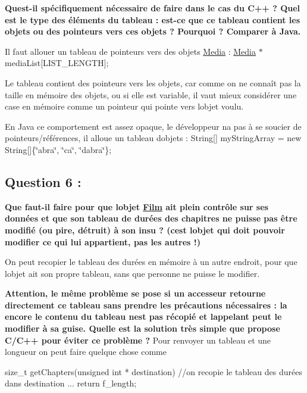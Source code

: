 {\bfseries Qu\textquotesingle{}est-\/il spécifiquement nécessaire de faire dans le cas du C++ ? Quel est le type des éléments du tableau \+: est-\/ce que ce tableau contient les objets ou des pointeurs vers ces objets ? Pourquoi ? Comparer à Java.}

Il faut allouer un tableau de pointeurs vers des objets {\ttfamily \hyperlink{classMedia}{Media}} \+: {\ttfamily \hyperlink{classMedia}{Media} $\ast$ media\+List\mbox{[}L\+I\+S\+T\+\_\+\+L\+E\+N\+G\+TH\mbox{]};}

Le tableau contient des pointeurs vers les objets, car comme on ne connaît pas la taille en mémoire des objets, ou si elle est variable, il vaut mieux considérer une case en mémoire comme un pointeur qui pointe vers l\textquotesingle{}objet voulu.

En Java ce comportement est assez opaque, le développeur n\textquotesingle{}a pas à se soucier de pointeurs/références, il alloue un tableau d\textquotesingle{}objets \+: {\ttfamily String\mbox{[}\mbox{]} my\+String\+Array = new String\mbox{[}\mbox{]}\{\char`\"{}abra\char`\"{}, \char`\"{}ca\char`\"{}, \char`\"{}dabra\char`\"{}\};}

\subsection*{Question 6 \+:}

{\bfseries Que faut-\/il faire pour que l\textquotesingle{}objet \hyperlink{classFilm}{Film} ait plein contrôle sur ses données et que son tableau de durées des chapitres ne puisse pas être modifié (ou pire, détruit) à son insu ? (c\textquotesingle{}est l\textquotesingle{}objet qui doit pouvoir modifier ce qui lui appartient, pas les autres !)}

On peut recopier le tableau des durées en mémoire à un autre endroit, pour que l\textquotesingle{}objet ait son propre tableau, sans que personne ne puisse le modifier.

{\bfseries Attention, le même problème se pose si un accesseur retourne directement ce tableau sans prendre les précautions nécessaires \+: la encore le contenu du tableau n\textquotesingle{}est pas récopié et l\textquotesingle{}appelant peut le modifier à sa guise. Quelle est la solution très simple que propose C/\+C++ pour éviter ce problème ?} Pour renvoyer un tableau et une longueur on peut faire quelque chose comme \begin{DoxyVerb}size_t getChapters(unsigned int * destination){
        //on recopie le tableau des durées dans destination
        ...
        return f_length; 
    }
\end{DoxyVerb}


